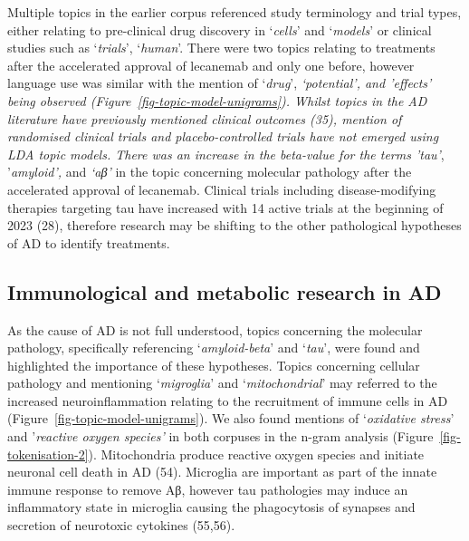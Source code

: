 \documentclass[
  a4paper,
]{article}
\begin{document}
Multiple topics in the earlier corpus referenced study terminology and
trial types, either relating to pre-clinical drug discovery in
`\emph{cells}' and `\emph{models}' or clinical studies such as
`\emph{trials}', `\emph{human}'. There were two topics relating to
treatments after the accelerated approval of lecanemab and only one
before, however language use was similar with the mention of
`\emph{drug}', \emph{`potential\emph{', and }'effects\emph{' being
observed (Figure~\ref{fig-topic-model-unigrams}). Whilst topics in the
AD literature have previously mentioned clinical outcomes (35), mention
of randomised clinical trials and placebo-controlled trials have not
emerged using LDA topic models. There was an increase in the beta-value
for the terms '}tau'}, '\emph{amyloid',} and \emph{`aβ'} in the topic
concerning molecular pathology after the accelerated approval of
lecanemab. Clinical trials including disease-modifying therapies
targeting tau have increased with 14 active trials at the beginning of
2023 (28), therefore research may be shifting to the other pathological
hypotheses of AD to identify treatments.

\hypertarget{immunological-and-metabolic-research-in-ad}{%
\subsection{Immunological and metabolic research in
AD}\label{immunological-and-metabolic-research-in-ad}}

As the cause of AD is not full understood, topics concerning the
molecular pathology, specifically referencing `\emph{amyloid-beta}' and
`\emph{tau}', were found and highlighted the importance of these
hypotheses. Topics concerning cellular pathology and mentioning
`\emph{migroglia}' and `\emph{mitochondrial}' may referred to the
increased neuroinflammation relating to the recruitment of immune cells
in AD (Figure~\ref{fig-topic-model-unigrams}). We also found mentions of
`\emph{oxidative stress}' and '\emph{reactive oxygen species'} in both
corpuses in the n-gram analysis (Figure~\ref{fig-tokenisation-2}).
Mitochondria produce reactive oxygen species and initiate neuronal cell
death in AD (54). Microglia are important as part of the innate immune
response to remove Aβ, however tau pathologies may induce an
inflammatory state in microglia causing the phagocytosis of synapses and
secretion of neurotoxic cytokines (55,56).
\end{document}
